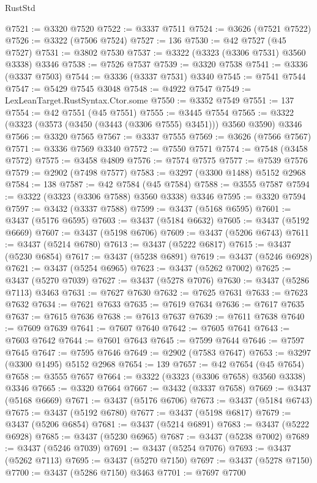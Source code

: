 \begin{lexlean}{RustStd}
\begin{coremodule}
@7521 := @3320 @7520
@7522 := @3337 @7511
@7524 := @3626 (@7521 @7522)
@7526 := @3322 (@7506 @7524)
@7527 := 136
@7530 := @42 @7527 (@45 @7527)
@7531 := @3802 @7530
@7537 := @3322 (@3323 (@3306 @7531) @3560 @3338) @3346
@7538 := @7526 @7537
@7539 := @3320 @7538
@7541 := @3336 (@3337 @7503)
@7544 := @3336 (@3337 @7531) @3340
@7545 := @7541 @7544
@7547 := @5429 @7545 @3048
@7548 := @4922 @7547
@7549 := LexLeanTarget.RustSyntax.Ctor.some
@7550 := @3352 @7549
@7551 := 137
@7554 := @42 @7551 (@45 @7551)
@7555 := @3445 @7554
@7565 := @3322 (@3323 (@3573 (@3450 (@3443 (@3306 @7555) @3451))) @3560 @3590) @3346
@7566 := @3320 @7565
@7567 := @3337 @7555
@7569 := @3626 (@7566 @7567)
@7571 := @3336 @7569 @3340
@7572 := @7550 @7571
@7574 := @7548 (@3458 @7572)
@7575 := @3458 @4809
@7576 := @7574 @7575
@7577 := @7539 @7576
@7579 := @2902 (@7498 @7577)
@7583 := @3297 (@3300 @1488) @5152 @2968
@7584 := 138
@7587 := @42 @7584 (@45 @7584)
@7588 := @3555 @7587
@7594 := @3322 (@3323 (@3306 @7588) @3560 @3338) @3346
@7595 := @3320 @7594
@7597 := @3432 (@3337 @7588)
@7599 := @3437 (@5168 @6595)
@7601 := @3437 (@5176 @6595)
@7603 := @3437 (@5184 @6632)
@7605 := @3437 (@5192 @6669)
@7607 := @3437 (@5198 @6706)
@7609 := @3437 (@5206 @6743)
@7611 := @3437 (@5214 @6780)
@7613 := @3437 (@5222 @6817)
@7615 := @3437 (@5230 @6854)
@7617 := @3437 (@5238 @6891)
@7619 := @3437 (@5246 @6928)
@7621 := @3437 (@5254 @6965)
@7623 := @3437 (@5262 @7002)
@7625 := @3437 (@5270 @7039)
@7627 := @3437 (@5278 @7076)
@7630 := @3437 (@5286 @7113) @3463
@7631 := @7627 @7630
@7632 := @7625 @7631
@7633 := @7623 @7632
@7634 := @7621 @7633
@7635 := @7619 @7634
@7636 := @7617 @7635
@7637 := @7615 @7636
@7638 := @7613 @7637
@7639 := @7611 @7638
@7640 := @7609 @7639
@7641 := @7607 @7640
@7642 := @7605 @7641
@7643 := @7603 @7642
@7644 := @7601 @7643
@7645 := @7599 @7644
@7646 := @7597 @7645
@7647 := @7595 @7646
@7649 := @2902 (@7583 @7647)
@7653 := @3297 (@3300 @1495) @5152 @2968
@7654 := 139
@7657 := @42 @7654 (@45 @7654)
@7658 := @3555 @7657
@7664 := @3322 (@3323 (@3306 @7658) @3560 @3338) @3346
@7665 := @3320 @7664
@7667 := @3432 (@3337 @7658)
@7669 := @3437 (@5168 @6669)
@7671 := @3437 (@5176 @6706)
@7673 := @3437 (@5184 @6743)
@7675 := @3437 (@5192 @6780)
@7677 := @3437 (@5198 @6817)
@7679 := @3437 (@5206 @6854)
@7681 := @3437 (@5214 @6891)
@7683 := @3437 (@5222 @6928)
@7685 := @3437 (@5230 @6965)
@7687 := @3437 (@5238 @7002)
@7689 := @3437 (@5246 @7039)
@7691 := @3437 (@5254 @7076)
@7693 := @3437 (@5262 @7113)
@7695 := @3437 (@5270 @7150)
@7697 := @3437 (@5278 @7150)
@7700 := @3437 (@5286 @7150) @3463
@7701 := @7697 @7700

\end{coremodule}
\end{lexlean}
